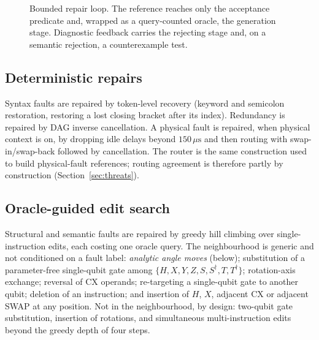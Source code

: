 \documentclass[journal]{IEEEtran}
\begin{document}
\begin{figure}[t]
\centering
{}
\caption{Bounded repair loop. The reference reaches only the acceptance
predicate and, wrapped as a query-counted oracle, the generation stage.
Diagnostic feedback carries the rejecting stage and, on a semantic rejection, a
counterexample test.}
\label{fig:arch}
\end{figure}

\subsection{Deterministic repairs}

Syntax faults are repaired by token-level recovery (keyword and semicolon
restoration, restoring a lost closing bracket after its index). Redundancy is
repaired by DAG inverse cancellation. A physical fault is repaired, when physical
context is on, by dropping idle delays beyond $150\,\mu\mathrm{s}$ and then
routing with swap-in/swap-back followed by cancellation. The router is the same
construction used to build physical-fault references; routing agreement is
therefore partly by construction (Section~\ref{sec:threats}).

\subsection{Oracle-guided edit search}

Structural and semantic faults are repaired by greedy hill climbing over
single-instruction edits, each costing one oracle query. The neighbourhood is
generic and not conditioned on a fault label:
\emph{analytic angle moves} (below); substitution of a parameter-free
single-qubit gate among $\{H,X,Y,Z,S,S^\dagger,T,T^\dagger\}$; rotation-axis
exchange; reversal of CX operands; re-targeting a single-qubit gate to another
qubit; deletion of an instruction; and insertion of $H$, $X$, adjacent CX or
adjacent SWAP at any position. Not in the neighbourhood, by design: two-qubit
gate substitution, insertion of rotations, and simultaneous multi-instruction
edits beyond the greedy depth of four steps.
\end{document}
